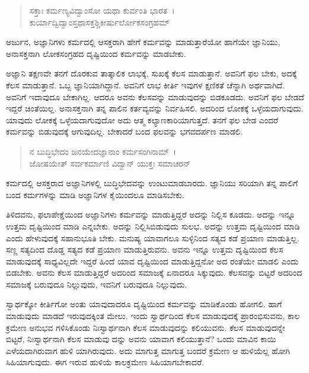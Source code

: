 \begin{verse}
ಸಕ್ತಾಃ ಕರ್ಮಣ್ಯವಿದ್ವಾಂಸೋ ಯಥಾ ಕುರ್ವಂತಿ ಭಾರತ~।\\ಕುರ್ಯಾದ್ವಿದ್ವಾಂಸ್ತಥಾಸಕ್ತಶ್ಚಿಕೀರ್ಷುರ್ಲೋಕಸಂಗ್ರಹಮ್ 
\end{verse}

{\small ಅರ್ಜುನ, ಅಜ್ಞಾನಿಗಳು ಕರ್ಮದಲ್ಲಿ ಆಸಕ್ತರಾಗಿ ಹೇಗೆ ಕರ್ಮವನ್ನು ಮಾಡುತ್ತಾರೆಯೋ ಹಾಗೆಯೇ ಜ್ಞಾನಿಯು, ಅನಾಸಕ್ತನಾಗಿ ಲೋಕಸಂಗ್ರಹದ ದೃಷ್ಟಿಯಿಂದ ಕರ್ಮವನ್ನು ಮಾಡಬೇಕು.}

ಅಜ್ಞಾನಿ ತಕ್ಷಣವೇ ತನಗೆ ದೊರಕುವ ತಾತ್ಕಾಲಿಕ ಲಾಭಕ್ಕೆ, ಸುಖಕ್ಕೆ ಕೆಲಸ ಮಾಡುತ್ತಾನೆ. ಅವನಿಗೆ ಫಲ ಬೇಕು, ಅದಕ್ಕೆ ಕೆಲಸ ಮಾಡುತ್ತಾನೆ. ಒಬ್ಬ ಜ್ಞಾನಿಯಾಗಿದ್ದಾನೆ. ಅವನಿಗೆ ಲಾಭ ಕೀರ್ತಿ ಇವುಗಳ ಕ್ಷಣಿಕತೆ ಚೆನ್ನಾಗಿ ಅರ್ಥವಾಗಿದೆ. ಅವನಿಗೆ ಇದಾವುದೂ ಬೇಕಾಗಿಲ್ಲ. ಆದರೂ ಅವನು ಕೆಲಸವನ್ನು ಮಾಡುವುದನ್ನು ಬಿಡಕೂಡದು. ಅವನಿಗೆ ಫಲ ಬೇಡದೆ ಇದ್ದರೆ ಚಿಂತೆಯಿಲ್ಲ. ಅನಾಸಕ್ತನಾಗಿ ತನ್ನ ಪಾಲಿನ ಕರ್ತವ್ಯವನ್ನು ನಿರ್ವಹಿಸಲಿ. ಅದರಿಂದ ಲೋಕಕ್ಕೆ ಒಳ್ಳೆಯದಾಗುವುದು. ಯಾವುದು ಲೋಕಕ್ಕೆ ಒಳ್ಳೆಯದಾಗುವುದೋ ಅದು ಆತ್ಮ ಕಲ್ಯಾಣಕಾರಿಯಾಗುತ್ತದೆ. ತನಗೆ ಫಲ ಬೇಡ ಎಂದರೆ ಕರ್ಮವನ್ನು ಬಿಡುವುದಕ್ಕೆ ಆಗುವುದಿಲ್ಲ. ಬೇಕಾದರೆ ಬಂದ ಫಲವನ್ನು ಭಗವದರ್ಪಣ ಮಾಡಲಿ.

\begin{verse}
ನ ಬುದ್ಧಿಭೇದಂ ಜನಯೇದಜ್ಞಾನಾಂ ಕರ್ಮಸಂಗಿನಾಮ್~।\\ಜೋಷಯೇತ್ ಸರ್ವಕರ್ಮಾಣಿ ವಿದ್ವಾನ್ ಯುಕ್ತಃ ಸಮಾಚರನ್ 
\end{verse}

{\small ಕರ್ಮದಲ್ಲಿ ಆಸಕ್ತರಾದ ಅಜ್ಞಾನಿಗಳಲ್ಲಿ ಬುದ್ಧಿಭೇದವನ್ನು ಉಂಟುಮಾಡಬಾರದು. ಜ್ಞಾನಿಯು ಸರಿಯಾಗಿ ತನ್ನ ಪಾಲಿಗೆ ಬಂದ ಕರ್ಮಗಳನ್ನು ಮಾಡಿ ಅಜ್ಞಾನಿಗಳ ಕೈಯಿಂದಲೂ ಮಾಡಿಸಬೇಕು.}

ತಿಳಿದವನು, ಫಲಾಪೇಕ್ಷೆಯಿಂದ ಅಜ್ಞಾನಿಗಳು ಕರ್ಮವನ್ನು ಮಾಡುತ್ತಿದ್ದರೆ ಅದನ್ನು ನಿಲ್ಲಿಸ ಕೂಡದು. ಅದನ್ನು ಇನ್ನೂ ಉತ್ತಮ ದೃಷ್ಟಿಯಿಂದ ಮಾಡಿ ಎನ್ನಬೇಕು. ಅದನ್ನು ನಿಲ್ಲಿಸಿಬಿಡುವುದು ಸುಲಭ. ಅದನ್ನು ಉತ್ತಮ ದೃಷ್ಟಿಯಿಂದ ಮಾಡಿ ಎಂದು ಹೇಳುವುದಕ್ಕೆ ಸಹಾನುಭೂತಿ ಬೇಕು. ಮನುಷ್ಯ ಯಾವಾಗಲೂ ಸುಳ್ಳಿನಿಂದ ಸತ್ಯದ ಕಡೆ ಪ್ರಯಾಣ ಮಾಡುತ್ತಿಲ್ಲ. ಸಣ್ಣ ಸತ್ಯದಿಂದ ದೊಡ್ಡ ಸತ್ಯದ ಕಡೆ ಪ್ರಯಾಣ ಮಾಡುತ್ತಿರುವನು. ಅವನು ಇನ್ನೂ ಉತ್ತಮ ದೃಷ್ಟಿಯಿಂದ ಕೆಲಸ ಮಾಡುವುದಕ್ಕೆ ಸಾಧ್ಯವಿಲ್ಲದೇ ಇದ್ದರೆ ಹಿಂದೆ ಯಾವ ದೃಷ್ಟಿಯಿಂದ ಮಾಡುತ್ತಿದ್ದನೋ ಅದ ರಂತೆಯೇ ಮಾಡಲಿ ಎಂದು ಬಿಡಬೇಕು. ಅವನು ಕೆಲಸ ಮಾಡುತ್ತಿದ್ದರೆ ಅದರಿಂದ ಸಮಾಜಕ್ಕೆ ಏನಾದರೂ ಸಿಕ್ಕುವುದು. ಕೆಲಸವನ್ನು ಬಿಟ್ಟರೆ ಅದರಿಂದ ಸಮಾಜಕ್ಕೆ ಬರುವುದೂ ನಿಲ್ಲುವುದು, ಇವನಿಗೆ ಬರುವುದೂ ನಿಲ್ಲುವುದು.

ಸ್ವಾರ್ಥಕ್ಕೋ ಕೀರ್ತಿಗೋ ಅಂತು ಯಾವುದಾದರೂ ದೃಷ್ಟಿಯಿಂದ ಕರ್ಮವನ್ನು ಮಾಡಿಕೊಂಡು ಹೋಗಲಿ. ಹಾಗೆ ಮಾಡುವುದು ಮಾಡದೆ ಇರುವುದಕ್ಕಿಂತ ಮೇಲು. ಇಂದು ಸ್ವಾರ್ಥದಿಂದ ಕೆಲಸ ಮಾಡುವುದಕ್ಕೆ ಪ್ರಾರಂಭಿಸುವನು, ಕಾಲ ಕ್ರಮೇಣ ಅನುಭವ ಗಳಿಸಿಕೊಂಡು ನಿಃಸ್ವಾರ್ಥನಾಗಿ ಕೆಲಸ ಮಾಡುವುದನ್ನು ಕಲಿಯುವನು. ಕೆಲಸ ಮಾಡುವುದನ್ನೇ ಬಿಟ್ಟರೆ, ನಿಃಸ್ವಾರ್ಥನಾಗಿ ಕೆಲಸ ಮಾಡುವು ದನ್ನು ಅವನು ಯಾವಾಗ ಕಲಿಯುತ್ತಾನೆ? ಒಂದು ಮಾವಿನ ಕಾಯಿ ಎಳೆಯದಾಗಿರುವಾಗ ಹುಳಿ ಯಾಗಿರುವುದು. ಅದು ಮಾಗುತ್ತ ಮಾಗುತ್ತ ಬಂದರೆ ಕ್ರಮೇಣ ಆ ಹುಳಿಯೆಲ್ಲ ಹೋಗಿ ಸಿಹಿಯಾಗುವುದು. ಈಗ ಇರುವ ಹುಳಿಯೆ ಕಾಲಕ್ರಮೇಣ ಸಿಹಿಯಾಗಬೇಕಾದರೆ.

